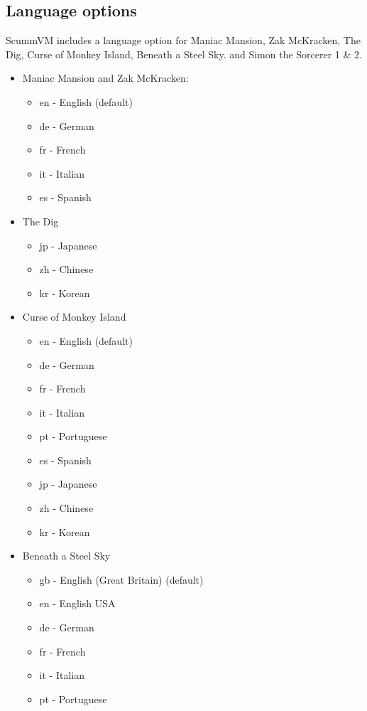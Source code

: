 \subsection{Language options}

ScummVM includes a language option for Maniac Mansion, Zak McKracken, The Dig,
Curse of Monkey Island, Beneath a Steel Sky. and Simon the Sorcerer 1 \& 2.\\
\begin{itemize}
\item Maniac Mansion and Zak McKracken:
  \begin{itemize}
   \item en  - English (default)
   \item de  - German
   \item fr  - French
   \item it  - Italian
   \item es  - Spanish
  \end{itemize}
\item The Dig
  \begin{itemize}
  \item jp  - Japanese
  \item zh  - Chinese
  \item kr  - Korean 
  \end{itemize}
\item Curse of Monkey Island
  \begin{itemize}
  \item en  - English (default)
  \item de  - German
  \item fr  - French
  \item it  - Italian
  \item pt  - Portuguese
  \item es  - Spanish
  \item jp  - Japanese
  \item zh  - Chinese
  \item kr  - Korean
  \end{itemize}
\item Beneath a Steel Sky
  \begin{itemize}
  \item gb  - English (Great Britain) (default)
  \item en  - English USA
  \item de  - German
  \item fr  - French
  \item it  - Italian
  \item pt  - Portuguese

\end{itemize}
\end{itemize}
